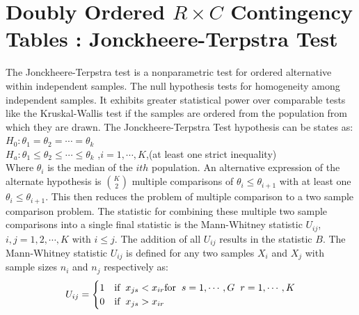 \documentclass[12pt,oneside]{report}
\theoremstyle{definition}
\theoremstyle{mystyle}
\begin{document}
\section{Doubly  Ordered $R \times C$ Contingency Tables : Jonckheere-Terpstra Test}

The Jonckheere-Terpstra test is a nonparametric test for ordered alternative within independent samples. The null hypothesis tests for homogeneity among independent samples. It exhibits greater statistical power over comparable tests like the Kruskal-Wallis test if the samples are ordered from the population from which they are drawn. The Jonckheere-Terpstra Test hypothesis can be states as:
$H_{0}:\theta_{1}=\theta_{2}=\cdots=\theta_{k}$\\
$H_{a}:\theta_{1} \leq \theta_{2} \leq \cdots \leq \theta_{k}$ ,$i=1,\cdots,K$,(at least one strict inequality)\\
Where $\theta_{i}$ is the median of the $ith$ population. An alternative expression of the alternate hypothesis is $\binom{K}{2}$ multiple comparisons of $\theta_{i}\leq \theta_{i+1}$ with at least one $\theta_{i}\le \theta_{i+1}$. This then reduces the problem of  multiple comparison to a  two sample comparison problem. The statistic for combining these multiple two sample comparisons into a single final statistic is the Mann-Whitney statistic $U_{ij}$, $i,j=1,2,\cdots,K$ with $i\le j$. The addition of all $U_{ij}$ results in the statistic $B$. The  Mann-Whitney statistic $U_{ij}$  is defined  for any two samples $X_{i}$ and $X_{j}$ with sample sizes $n_{i}$ and $n_{j}$ respectively as:\\
\[ U_{ij}=\begin{cases}
1 & \mbox{if} \hspace{2mm} x_{js}< x_{ir} \mbox{for}\hspace{2mm}  s=1,\cdots,G \hspace{2mm}r=1,\cdots,K\\
0 & \mbox{if}\hspace{2mm} x_{js}>x_{ir}\\
\end{cases}
\]
\end{document}
